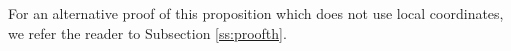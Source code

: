 \documentclass[12pt]{article}
\newtheorem{lem}[theorem]{Lemma}
\begin{document}
For an alternative proof of this proposition which does not use local coordinates, we refer the reader to Subsection \ref{ss:proofth}.


\end{document}
